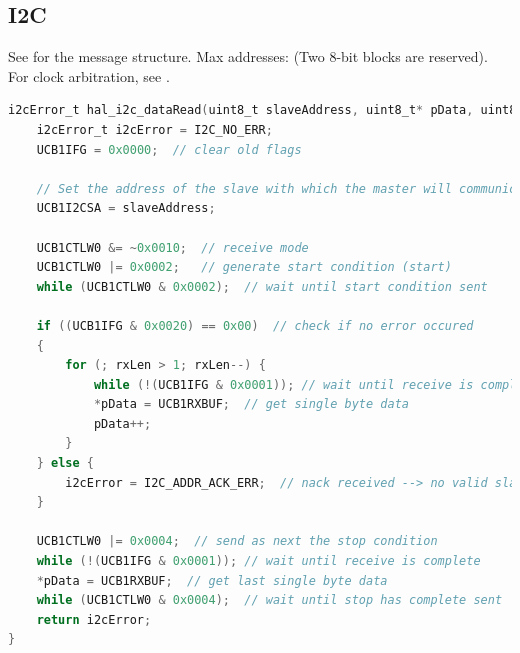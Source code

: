 \subsection{I2C }
See  for the message structure.
Max addresses:  (Two 8-bit blocks are reserved).
For clock arbitration, see .

\begin{lstlisting}[language=C]
i2cError_t hal_i2c_dataRead(uint8_t slaveAddress, uint8_t* pData, uint8_t rxLen) {
	i2cError_t i2cError = I2C_NO_ERR;
	UCB1IFG = 0x0000;  // clear old flags
	
	// Set the address of the slave with which the master will communicate.
	UCB1I2CSA = slaveAddress;
	
	UCB1CTLW0 &= ~0x0010;  // receive mode
	UCB1CTLW0 |= 0x0002;   // generate start condition (start)
	while (UCB1CTLW0 & 0x0002);  // wait until start condition sent
	
	if ((UCB1IFG & 0x0020) == 0x00)  // check if no error occured
	{
		for (; rxLen > 1; rxLen--) {
			while (!(UCB1IFG & 0x0001)); // wait until receive is complete (RXIFG)
			*pData = UCB1RXBUF;  // get single byte data
			pData++;
		}
	} else {
		i2cError = I2C_ADDR_ACK_ERR;  // nack received --> no valid slave address
	}
	
	UCB1CTLW0 |= 0x0004;  // send as next the stop condition
	while (!(UCB1IFG & 0x0001)); // wait until receive is complete
	*pData = UCB1RXBUF;  // get last single byte data
	while (UCB1CTLW0 & 0x0004);  // wait until stop has complete sent
	return i2cError;
}
\end{lstlisting}
